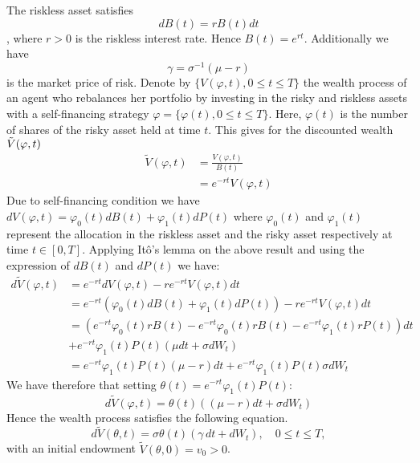 \documentclass[oneside, a4paper, onecolumn, 11pt]{article}
\begin{document}
The riskless asset satisfies $$dB(t) = rB(t)dt$$, where \( r > 0 \) is the riskless interest rate.  Hence $B(t) = e^{rt}$. Additionally we have $$ \gamma = \sigma^{-1}(\mu - r) $$ is the market price of risk. 
Denote by \( \{V(\varphi, t), 0 \leq t \leq T\} \) the wealth process of an agent who rebalances her portfolio by investing in the risky and riskless assets with a self-financing strategy \( \varphi = \{ \varphi(t), 0 \leq t \leq T \} \). Here, \( \varphi(t)  \) is the number of shares of the risky asset held at time \( t \). 
This gives for the discounted wealth $\Tilde{V}(\varphi,t)$
\begin{align}
\tilde{V}({\varphi},t) &= \frac{V(\varphi,t)}{B(t)}\\ 
                     &= e^{-rt}V(\varphi,t)
\end{align}
Due to self-financing condition we have $dV(\varphi,t)= \varphi_0(t)dB(t) + \varphi_1(t)dP(t)$ \cite{ZagstInvest} where $\varphi_0(t)$ and $\varphi_1(t)$ represent the allocation in the riskless asset and the risky asset respectively at time $t\in[0,T]$. Applying Itô's lemma on the above result and using the expression of $dB(t)$ and $dP(t)$ we have:
\begin{align*}
   d\tilde{V}(\varphi,t) &= e^{-rt}dV(\varphi,t) - re^{-rt}V(\varphi,t)dt\\
                        &=  e^{-rt}\left(\varphi_0(t) dB(t) + \varphi_1(t) dP(t)\right)- re^{-rt}V(\varphi,t)dt\\ 
                        &= \left(e^{-rt}\varphi_0(t) rB(t)  - e^{-rt} \varphi_0(t)rB(t) - e^{-rt}\varphi_1(t) rP(t) \right)dt \\
                        &+ e^{-rt}\varphi_1(t) P(t) (\mu dt + \sigma dW_t) \\
                        &= e^{-rt}\varphi_1(t)P(t)(\mu -r) dt + e^{-rt}\varphi_1(t)P(t)\sigma dW_t
\end{align*}
We have therefore that setting $\theta(t) = e^{-rt}\varphi_1(t)P(t)$:
\begin{equation}
    d\tilde{V}(\varphi,t) =  \theta(t)((\mu-r)dt + \sigma dW_t)
 \label{eq:wealth_for_algo}   
\end{equation}
Hence the wealth process satisfies the following equation.
\begin{equation}  
d\tilde{V}(\theta,t) = \sigma \theta(t) (\gamma \, dt + dW_t), \quad 0 \leq t \leq T,  \label{SDE:wealth_process}
\end{equation}
with an initial endowment \(  \tilde{V}(\theta, 0) = v_0 > 0 \). 
\end{document}
